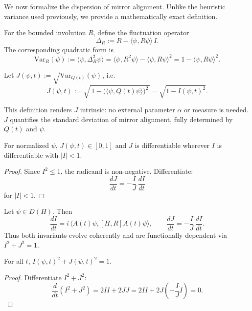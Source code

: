 We now formalize the dispersion of mirror alignment.
Unlike the heuristic variance used previously, we provide a mathematically exact definition.

\begin{definition}
For the bounded involution $R$, define the fluctuation operator
\[
\Delta_R := R - \langle \psi, R\psi\rangle\,I.
\]
The corresponding quadratic form is
\[
\mathrm{Var}_R(\psi) := \langle \psi, \Delta_R^2 \psi\rangle
= \langle \psi, R^2 \psi\rangle - \langle \psi, R\psi\rangle^2
= 1 - \langle \psi, R\psi\rangle^2.
\]
\end{definition}

\begin{definition}
Let $J(\psi,t):=\sqrt{\mathrm{Var}_{Q(t)}(\psi)}$,
i.e.
\[
J(\psi,t)
:= \sqrt{\,1 - \big(\langle \psi,Q(t)\psi\rangle\big)^2\,}
= \sqrt{1 - I(\psi,t)^2}.
\]
\]
\end{definition}

\begin{remark}
This definition renders $J$ intrinsic: no external parameter $\alpha$ or measure is needed.
$J$ quantifies the standard deviation of mirror alignment, fully determined by $Q(t)$ and $\psi$.
\end{remark}

\begin{lemma}
For normalized $\psi$, $J(\psi,t)\in[0,1]$ and $J$ is differentiable wherever $I$ is differentiable with $|I|<1$.
\end{lemma}

\begin{proof}
Since $I^2\le1$, the radicand is non-negative.
Differentiate:
\[
\frac{dJ}{dt} = -\frac{I}{J}\,\frac{dI}{dt}
\]
for $|I|<1$.
\end{proof}

\begin{proposition}
Let $\psi\in D(H)$.
Then
\[
\frac{dI}{dt}= i\,\langle A(t)\psi,[H,R]A(t)\psi\rangle,\qquad
\frac{dJ}{dt}=-\frac{I}{J}\,\frac{dI}{dt}.
\]
Thus both invariants evolve coherently and are functionally dependent via $I^2+J^2=1$.
\end{proposition}

\begin{corollary}
For all $t$, $I(\psi,t)^2+J(\psi,t)^2=1$.
\end{corollary}

\begin{proof}
Differentiate $I^2+J^2$:
\[
\frac{d}{dt}(I^2+J^2)=2I\dot I+2J\dot J
=2I\dot I+2J\left(-\frac{I}{J}\dot I\right)=0.
\]
\end{proof}

